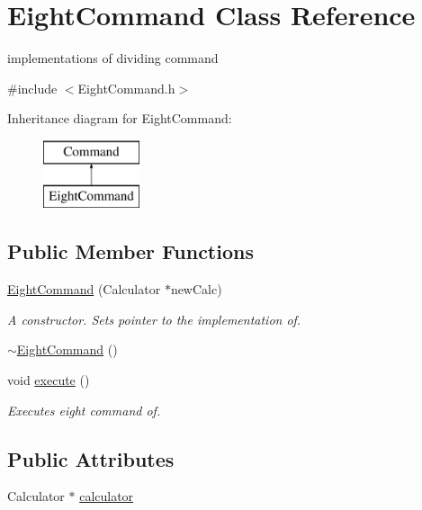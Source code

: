 \hypertarget{class_eight_command}{}\section{Eight\+Command Class Reference}
\label{class_eight_command}


implementations of dividing command  




{\ttfamily \#include $<$Eight\+Command.\+h$>$}

Inheritance diagram for Eight\+Command\+:\begin{figure}[H]
\begin{center}
\leavevmode
\includegraphics[height=2.000000cm]{class_eight_command}
\end{center}
\end{figure}
\subsection*{Public Member Functions}
\begin{DoxyCompactItemize}
\item 
\hyperlink{class_eight_command_afe5d23069dc3e2baa96cf239e4164023}{Eight\+Command} (Calculator $\ast$new\+Calc)
\begin{DoxyCompactList}\small\item\em A constructor. Sets pointer to the implementation of. \end{DoxyCompactList}\item 
\hyperlink{class_eight_command_ae50c3d54eae8a27f919cd1e4f8a0eaeb}{$\sim$\+Eight\+Command} ()
\item 
void \hyperlink{class_eight_command_afe2b90086e76b28a9adbcde328c1b2ce}{execute} ()
\begin{DoxyCompactList}\small\item\em Executes eight command of. \end{DoxyCompactList}\end{DoxyCompactItemize}
\subsection*{Public Attributes}
\begin{DoxyCompactItemize}
\item 
Calculator $\ast$ \hyperlink{class_eight_command_aa4c2a48089ca694fc1122902fc5439c0}{calculator}
\end{DoxyCompactItemize}


